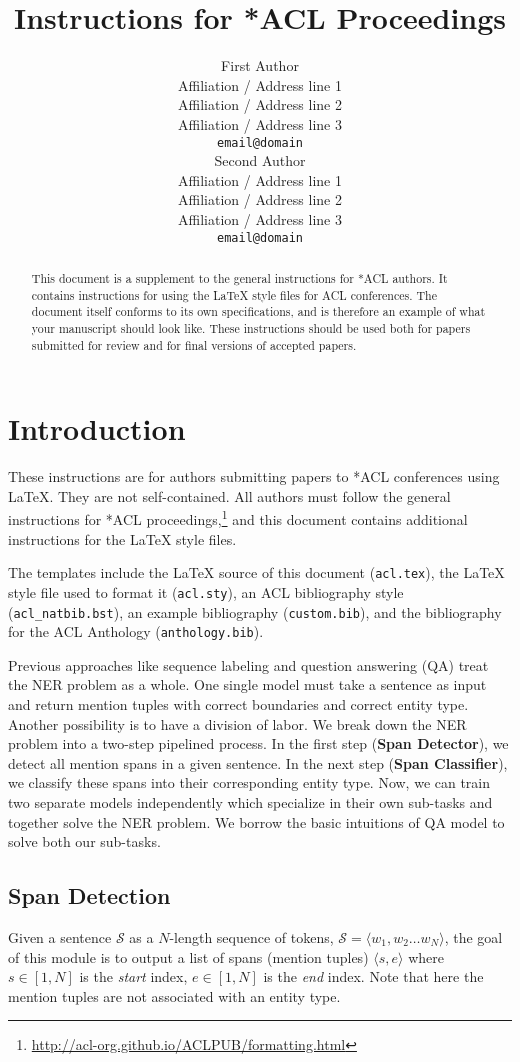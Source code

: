 \documentclass[11pt]{article}
\title{Instructions for *ACL Proceedings}
\author{First Author \\
  Affiliation / Address line 1 \\
  Affiliation / Address line 2 \\
  Affiliation / Address line 3 \\
  \texttt{email@domain} \\\And
  Second Author \\
  Affiliation / Address line 1 \\
  Affiliation / Address line 2 \\
  Affiliation / Address line 3 \\
  \texttt{email@domain} \\}
\begin{document}
\maketitle
\begin{abstract}
This document is a supplement to the general instructions for *ACL authors. It contains instructions for using the \LaTeX{} style files for ACL conferences. 
The document itself conforms to its own specifications, and is therefore an example of what your manuscript should look like.
These instructions should be used both for papers submitted for review and for final versions of accepted papers.
\end{abstract}

\section{Introduction}

These instructions are for authors submitting papers to *ACL conferences using \LaTeX. They are not self-contained. All authors must follow the general instructions for *ACL proceedings,\footnote{\url{http://acl-org.github.io/ACLPUB/formatting.html}} and this document contains additional instructions for the \LaTeX{} style files.

The templates include the \LaTeX{} source of this document (\texttt{acl.tex}),
the \LaTeX{} style file used to format it (\texttt{acl.sty}),
an ACL bibliography style (\texttt{acl\_natbib.bst}),
an example bibliography (\texttt{custom.bib}),
and the bibliography for the ACL Anthology (\texttt{anthology.bib}).

Previous approaches like sequence labeling and question answering (QA) treat the NER problem as a whole. One single model must take a sentence as input and return mention tuples with correct boundaries and correct entity type. Another possibility is to have a division of labor. We break down the NER problem into a two-step pipelined process. In the first step (\textbf{Span Detector}), we detect all mention spans in a given sentence. In the next step (\textbf{Span Classifier}), we classify these spans into their corresponding entity type. Now, we can train two separate models independently which specialize in their own sub-tasks and together solve the NER problem. We borrow the basic intuitions of QA model to solve both our sub-tasks.

\subsection{Span Detection}
Given a sentence $\mathcal{S}$ as a $N$-length sequence of tokens, $\mathcal{S} = \langle w_1, w_2 \ldots w_N \rangle$, the goal of this module is to output a list of spans (mention tuples) $\langle s, e\rangle$ where $s \in [1, N]$ is the \textit{start} index, $e \in [1, N]$ is the \textit{end} index. Note that here the mention tuples are not associated with an entity type. 
\end{document}
